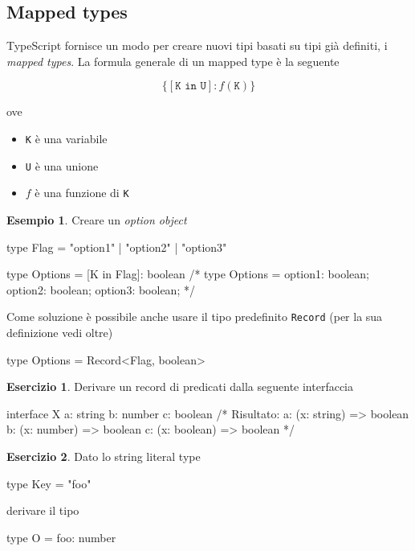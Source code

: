 \documentclass[12pt]{article}
\theoremstyle{definition}
\newtheorem{example}{Esempio}[subsection]
\newtheorem{exercise}{Esercizio}[subsection]
\newenvironment{code}
  {\vspace{0.5cm} \VerbatimEnvironment\begin{typescriptcode}}
  {\end{typescriptcode} \vspace{0.2cm}}
\begin{document}
\subsection{Mapped types}

TypeScript fornisce un modo per creare nuovi tipi basati su tipi già definiti, i \emph{mapped types}.
La formula generale di un mapped type è la seguente

$$
\{ [\texttt{K in U}]: f(\texttt{K}) \}
$$

ove

\begin{itemize}
  \item \texttt{K} è una variabile
  \item \texttt{U} è una unione
  \item $f$ è una funzione di \texttt{K}
\end{itemize}

\begin{example}
Creare un \emph{option object}

\begin{code}
type Flag = "option1" | "option2" | "option3"

type Options = { [K in Flag]: boolean }
/*
type Options = {
    option1: boolean;
    option2: boolean;
    option3: boolean;
}
*/
\end{code}
\end{example}

Come soluzione è possibile anche usare il tipo predefinito \texttt{Record} (per la sua definizione vedi oltre)

\begin{code}
type Options = Record<Flag, boolean>
\end{code}

\begin{exercise}
Derivare un record di predicati dalla seguente interfaccia

\begin{code}
interface X {
  a: string
  b: number
  c: boolean
}
/*
Risultato:
{
  a: (x: string) => boolean
  b: (x: number) => boolean
  c: (x: boolean) => boolean
}
*/
\end{code}
\end{exercise}

\begin{exercise}
Dato lo string literal type

\begin{code}
type Key = "foo"
\end{code}

derivare il tipo

\begin{code}
type O = {
  foo: number
}
\end{code}
\end{exercise}
\end{document}
